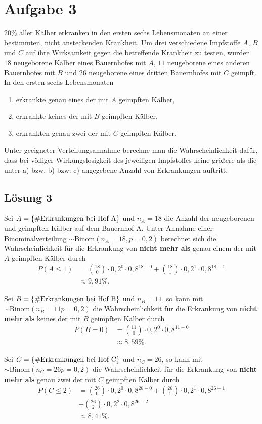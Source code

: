 \documentclass[main.tex]{subfiles}
\begin{document}
\section{Aufgabe 3}
$20\%$ aller Kälber erkranken in den ersten sechs Lebensmonaten an einer bestimmten, nicht ansteckenden Krankheit.
Um drei verschiedene Impfstoffe $A$, $B$ und $C$ auf ihre Wirksamkeit gegen die betreffende Krankheit zu testen, wurden $18$ neugeborene Kälber eines Bauernhofes mit $A$, $11$ neugeborene eines anderen Bauernhofes mit $B$ und $26$ neugeborene eines dritten Bauernhofes mit $C$ geimpft. In den ersten sechs Lebensmonaten
\begin{enumerate}
	\item erkrankte genau eines der mit $A$ geimpften Kälber,
	\item erkrankte keines der mit $B$ geimpften Kälber,
	\item erkrankten genau zwei der mit $C$ geimpften Kälber.
\end{enumerate}
Unter geeigneter Verteilungsannahme berechne man die Wahrscheinlichkeit dafür, dass bei völliger Wirkungslosigkeit des jeweiligen Impfstoffes keine größere als die unter a) bzw. b) bzw. c) angegebene Anzahl von Erkrankungen auftritt.

\subsection{Lösung 3}
Sei $A = \set*{\#\text{Erkrankungen bei Hof A}}$ und $n_A = 18$ die Anzahl der neugeborenen und geimpften Kälber auf dem Bauernhof A.
Unter Annahme einer Binominalverteilung $\sim \text{Binom}(n_A = 18, p = 0,2)$ berechnet sich die Wahrscheinlichkeit für die Erkrankung von
\textbf{nicht mehr als} genau einem der mit $A$ geimpften Kälber durch
$$\begin{aligned}
	P(A\leq 1) &= \binom{18}{0} \cdot 0,2^0 \cdot 0,8^{18-0} + \binom{18}{1} \cdot 0,2^1 \cdot 0,8^{18-1} \\
	&\approx 9,91 \%.
\end{aligned}$$

Sei $B = \set*{\#\text{Erkrankungen bei Hof B}}$ und $n_B = 11$, so kann mit $\sim \text{Binom}(n_B = 11 p = 0,2)$ die Wahrscheinlichkeit für die Erkrankung von
\textbf{nicht mehr als} keines der mit $B$ geimpften Kälber durch
$$\begin{aligned}
	P(B{=}0) &= \binom{11}{0} \cdot 0,2^0 \cdot 0,8^{11-0} \\
	&\approx 8,59 \%.
\end{aligned}$$

Sei $C = \set*{\#\text{Erkrankungen bei Hof C}}$ und $n_C = 26$, so kann mit $\sim \text{Binom}(n_C = 26 p = 0,2)$ die Wahrscheinlichkeit für die Erkrankung von
\textbf{nicht mehr als} genau zwei der mit $C$ geimpften Kälber durch
$$\begin{aligned}
	P(C\leq 2) &= \binom{26}{0} \cdot 0,2^0 \cdot 0,8^{26-0}
	+ \binom{26}{1} \cdot 0,2^1 \cdot 0,8^{26-1} \\
	&+ \binom{26}{2} \cdot 0,2^2 \cdot 0,8^{26-2} \\
	&\approx 8,41 \%.
\end{aligned}$$
\end{document}
